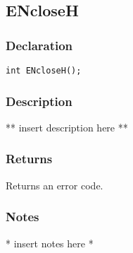 \subsection{ENcloseH}
\subsubsection{Declaration}
\begin{lstlisting}
int ENcloseH();
\end{lstlisting}
\subsubsection{Description}
** insert description here **
\subsubsection{Returns}
Returns an error code.
\subsubsection{Notes}
* insert notes here *